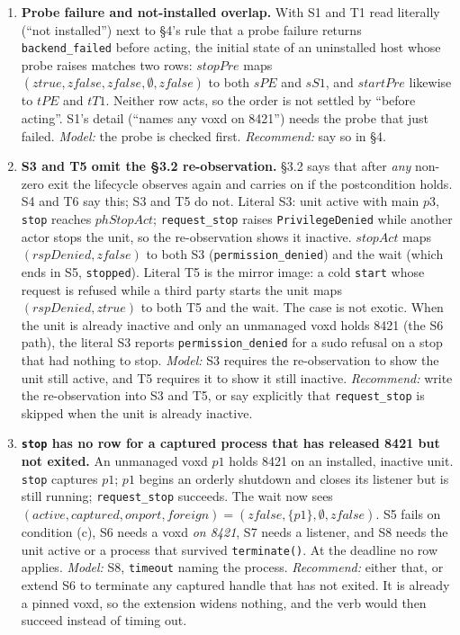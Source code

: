 \documentclass[a4paper,10pt,fleqn]{article}
\begin{document}
\begin{enumerate}
  \item[\textbf{F0.}] \textbf{Probe failure and not-installed overlap.}
    With S1 and T1 read literally (``not installed'') next to \S4's rule
    that a probe failure returns \texttt{backend\_failed} before acting,
    the initial state of an uninstalled host whose probe raises matches two
    rows: $stopPre$ maps $(ztrue, zfalse, zfalse, \emptyset, zfalse)$ to
    both $sPE$ and $sS1$, and $startPre$ likewise to $tPE$ and $tT1$.
    Neither row acts, so the order is not settled by ``before acting''. S1's
    detail (``names any voxd on 8421'') needs the probe that just failed.
    \emph{Model:} the probe is checked first. \emph{Recommend:} say so in
    \S4.

  \item[\textbf{F1.}] \textbf{S3 and T5 omit the \S3.2 re-observation.}
    \S3.2 says that after \emph{any} non-zero exit the lifecycle observes
    again and carries on if the postcondition holds. S4 and T6 say this; S3
    and T5 do not. Literal S3: unit active with main $p3$,
    \texttt{stop} reaches $phStopAct$; \texttt{request\_stop} raises
    \texttt{PrivilegeDenied} while another actor stops the unit, so the
    re-observation shows it inactive. $stopAct$ maps
    $(rspDenied, zfalse)$ to both S3 (\texttt{permission\_denied}) and the
    wait (which ends in S5, \texttt{stopped}). Literal T5 is the mirror
    image: a cold \texttt{start} whose request is refused while a third
    party starts the unit maps $(rspDenied, ztrue)$ to both T5 and the
    wait. The case is not exotic. When the unit is already inactive and only
    an unmanaged voxd holds 8421 (the S6 path), the literal S3 reports
    \texttt{permission\_denied} for a sudo refusal on a stop that had
    nothing to stop. \emph{Model:} S3 requires the re-observation to show
    the unit still active, and T5 requires it to show it still inactive.
    \emph{Recommend:} write the re-observation into S3 and T5, or say
    explicitly that \texttt{request\_stop} is skipped when the unit is
    already inactive.

  \item[\textbf{F2.}] \textbf{\texttt{stop} has no row for a captured
    process that has released 8421 but not exited.} An unmanaged voxd $p1$
    holds 8421 on an installed, inactive unit. \texttt{stop} captures
    $p1$; $p1$ begins an orderly shutdown and closes its listener but is
    still running; \texttt{request\_stop} succeeds. The wait now sees
    $(active, captured, onport, foreign) =
    (zfalse, \{p1\}, \emptyset, zfalse)$. S5 fails on condition (c), S6
    needs a voxd \emph{on 8421}, S7 needs a listener, and S8 needs the unit
    active or a process that survived \texttt{terminate()}. At the deadline
    no row applies. \emph{Model:} S8, \texttt{timeout} naming the process.
    \emph{Recommend:} either that, or extend S6 to terminate any captured
    handle that has not exited. It is already a pinned voxd, so the extension
    widens nothing, and the verb would then succeed instead of timing out.


\end{enumerate}
\end{document}
